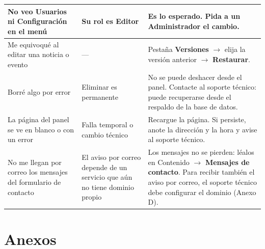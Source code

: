 \documentclass[11pt,letterpaper]{report}
\begin{document}
\begin{longtable}{>{\raggedright\arraybackslash}p{}>{\raggedright\arraybackslash}p{}>{\raggedright\arraybackslash}p{}}
\rowcolor{filaalt}No veo Usuarios ni Configuración en el menú & Su rol es Editor & Es lo esperado. Pida a un Administrador el cambio. \\ \midrule
Me equivoqué al editar una noticia o evento & — & Pestaña \textbf{Versiones} $\rightarrow$ elija la versión anterior $\rightarrow$ \textbf{Restaurar}. \\ \midrule
\rowcolor{filaalt}Borré algo por error & Eliminar es permanente & No se puede deshacer desde el panel. Contacte al soporte técnico: puede recuperarse desde el respaldo de la base de datos. \\ \midrule
La página del panel se ve en blanco o con un error & Falla temporal o cambio técnico & Recargue la página. Si persiste, anote la dirección y la hora y avise al soporte técnico. \\ \midrule
\rowcolor{filaalt}No me llegan por correo los mensajes del formulario de contacto & El aviso por correo depende de un servicio que aún no tiene dominio propio & Los mensajes no se pierden: léalos en Contenido $\rightarrow$ \textbf{Mensajes de contacto}. Para recibir también el aviso por correo, el soporte técnico debe configurar el dominio (Anexo D). \\ \bottomrule
\end{longtable}
\chapter{Anexos}
\end{document}
